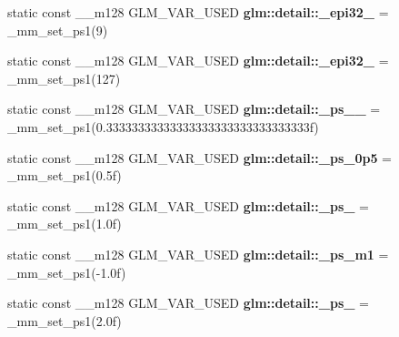 \begin{DoxyCompactItemize}
\item 
\hypertarget{namespaceglm_1_1detail_a9e125559f52b96642a22c6dbfa50c259}{}static const \+\_\+\+\_\+m128 G\+L\+M\+\_\+\+V\+A\+R\+\_\+\+U\+S\+E\+D {\bfseries glm\+::detail\+::\+\_\+epi32\+\_} = \+\_\+mm\+\_\+set\+\_\+ps1(9)\label{namespaceglm_1_1detail_a9e125559f52b96642a22c6dbfa50c259}

\item 
\hypertarget{namespaceglm_1_1detail_a9a02cc029ee1cbea65f003b9ac1993fd}{}static const \+\_\+\+\_\+m128 G\+L\+M\+\_\+\+V\+A\+R\+\_\+\+U\+S\+E\+D {\bfseries glm\+::detail\+::\+\_\+epi32\+\_} = \+\_\+mm\+\_\+set\+\_\+ps1(127)\label{namespaceglm_1_1detail_a9a02cc029ee1cbea65f003b9ac1993fd}

\item 
\hypertarget{namespaceglm_1_1detail_a2e07c28844ad7f1d8eac01e54d4837e2}{}static const \+\_\+\+\_\+m128 G\+L\+M\+\_\+\+V\+A\+R\+\_\+\+U\+S\+E\+D {\bfseries glm\+::detail\+::\+\_\+ps\+\_\+\_} = \+\_\+mm\+\_\+set\+\_\+ps1(0.\+33333333333333333333333333333333f)\label{namespaceglm_1_1detail_a2e07c28844ad7f1d8eac01e54d4837e2}

\item 
\hypertarget{namespaceglm_1_1detail_aca3a4bdea44434b82764849b10aacf50}{}static const \+\_\+\+\_\+m128 G\+L\+M\+\_\+\+V\+A\+R\+\_\+\+U\+S\+E\+D {\bfseries glm\+::detail\+::\+\_\+ps\+\_\+0p5} = \+\_\+mm\+\_\+set\+\_\+ps1(0.\+5f)\label{namespaceglm_1_1detail_aca3a4bdea44434b82764849b10aacf50}

\item 
\hypertarget{namespaceglm_1_1detail_a99bebff1c9bbec797dab83778ab0dcc7}{}static const \+\_\+\+\_\+m128 G\+L\+M\+\_\+\+V\+A\+R\+\_\+\+U\+S\+E\+D {\bfseries glm\+::detail\+::\+\_\+ps\+\_} = \+\_\+mm\+\_\+set\+\_\+ps1(1.\+0f)\label{namespaceglm_1_1detail_a99bebff1c9bbec797dab83778ab0dcc7}

\item 
\hypertarget{namespaceglm_1_1detail_a2d857b098b7ceca8fc8e4f35a09cdace}{}static const \+\_\+\+\_\+m128 G\+L\+M\+\_\+\+V\+A\+R\+\_\+\+U\+S\+E\+D {\bfseries glm\+::detail\+::\+\_\+ps\+\_\+m1} = \+\_\+mm\+\_\+set\+\_\+ps1(-\/1.\+0f)\label{namespaceglm_1_1detail_a2d857b098b7ceca8fc8e4f35a09cdace}

\item 
\hypertarget{namespaceglm_1_1detail_a347d7fdaacc1ca526c0c89a4535a9c8a}{}static const \+\_\+\+\_\+m128 G\+L\+M\+\_\+\+V\+A\+R\+\_\+\+U\+S\+E\+D {\bfseries glm\+::detail\+::\+\_\+ps\+\_} = \+\_\+mm\+\_\+set\+\_\+ps1(2.\+0f)\label{namespaceglm_1_1detail_a347d7fdaacc1ca526c0c89a4535a9c8a}


\end{DoxyCompactItemize}
